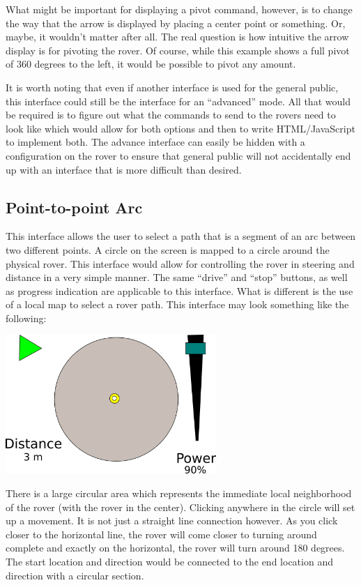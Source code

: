 \documentclass[letterpaper,10pt]{article}
\begin{document}
    What might be important for displaying a pivot command, however, is to change the way that the arrow is displayed by placing a center point or something.  Or, maybe, it wouldn't matter after all.  The real question is how intuitive the arrow display is for pivoting the rover.  Of course, while this example shows a full pivot of 360 degrees to the left, it would be possible to pivot any amount.
    
    It is worth noting that even if another interface is used for the general public, this interface could still be the interface for an ``advanced'' mode.  All that would be required is to figure out what the commands to send to the rovers need to look like which would allow for both options and then to write HTML/JavaScript to implement both.  The advance interface can easily be hidden with a configuration on the rover to ensure that general public will not accidentally end up with an interface that is more difficult than desired.
    
  \subsection{Point-to-point Arc}
    This interface allows the user to select a path that is a segment of an arc between two different points.  A circle on the screen is mapped to a circle around the physical rover.  This interface would allow for controlling the rover in steering and distance in a very simple manner.  The same ``drive'' and ``stop'' buttons, as well as progress indication are applicable to this interface.  What is different is the use of a local map to select a rover path.  This interface may look something like the following:
    
    \includegraphics[width=8cm]{basic_arc}
    
    There is a large circular area which represents the immediate local neighborhood of the rover (with the rover in the center).  Clicking anywhere in the circle will set up a movement.  It is not just a straight line connection however.  As you click closer to the horizontal line, the rover will come closer to turning around complete and exactly on the horizontal, the rover will turn around 180 degrees.  The start location and direction would be connected to the end location and direction with a circular section.
    
\end{document}

